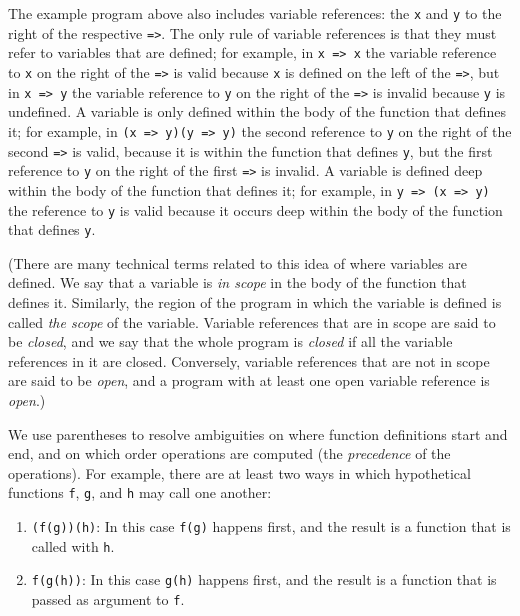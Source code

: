 \documentclass[12pt, oneside]{book}
\begin{document}
The example program above also includes variable references: the \texttt{x} and \texttt{y} to the right of the respective \texttt{=>}. The only rule of variable references is that they must refer to variables that are defined; for example, in \texttt{x => x} the variable reference to \texttt{x} on the right of the \texttt{=>} is valid because \texttt{x} is defined on the left of the \texttt{=>}, but in \texttt{x => y} the variable reference to \texttt{y} on the right of the \texttt{=>} is invalid because \texttt{y} is undefined. A variable is only defined within the body of the function that defines it; for example, in \texttt{(x => y)(y => y)} the second reference to \texttt{y} on the right of the second \texttt{=>} is valid, because it is within the function that defines \texttt{y}, but the first reference to \texttt{y} on the right of the first \texttt{=>} is invalid. A variable is defined deep within the body of the function that defines it; for example, in \texttt{y => (x => y)} the reference to \texttt{y} is valid because it occurs deep within the body of the function that defines \texttt{y}.

(There are many technical terms related to this idea of where variables are defined. We say that a variable is \emph{in scope} in the body of the function that defines it. Similarly, the region of the program in which the variable is defined is called \emph{the scope} of the variable. Variable references that are in scope are said to be \emph{closed}, and we say that the whole program is \emph{closed} if all the variable references in it are closed. Conversely, variable references that are not in scope are said to be \emph{open}, and a program with at least one open variable reference is \emph{open}.)

We use parentheses to resolve ambiguities on where function definitions start and end, and on which order operations are computed (the \emph{precedence} of the operations). For example, there are at least two ways in which hypothetical functions \texttt{f}, \texttt{g}, and \texttt{h} may call one another:

\begin{enumerate}
\item \texttt{(f(g))(h)}: In this case \texttt{f(g)} happens first, and the result is a function that is called with \texttt{h}.

\item \texttt{f(g(h))}: In this case \texttt{g(h)} happens first, and the result is a function that is passed as argument to \texttt{f}.
\end{enumerate}
\end{document}
